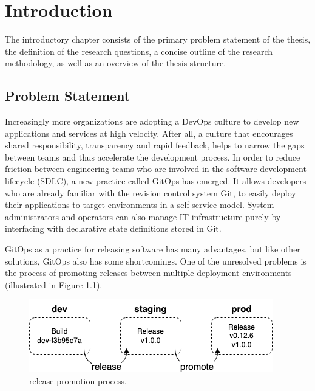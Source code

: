 
\chapter{Introduction}
\label{introduction}

The introductory chapter consists of the primary problem statement of the thesis,
the definition of the research questions,
a concise outline of the research methodology,
as well as
an overview of the thesis structure.

\section{Problem Statement}


Increasingly more organizations are adopting 
a DevOps culture to develop new applications and services at high velocity. 
After all, a culture that encourages shared responsibility, transparency and rapid feedback, 
helps to narrow the gaps between teams and thus accelerate the development process.
In order to
reduce friction between engineering teams who are involved in the software development lifecycle (SDLC),
a new practice called GitOps has emerged.
It allows developers who are already familiar with the revision control system Git,
to easily deploy their applications to target environments in a self-service model.
System administrators and operators can also manage IT infrastructure
purely by interfacing with declarative state definitions stored in Git.
\bigskip



\noindent
GitOps as a practice for releasing software has many advantages,
but like other solutions, GitOps also has some shortcomings.
One of the unresolved problems is
the process of promoting releases between multiple deployment environments (illustrated in Figure \ref{fig:releasePromotionProcess}).

\begin{figure}[h]
	\centering
	\includegraphics[width=.55\linewidth]{figures/release-promotion.drawio.png}
	\caption{release promotion process.
	}
	\label{fig:releasePromotionProcess}	
\end{figure}

